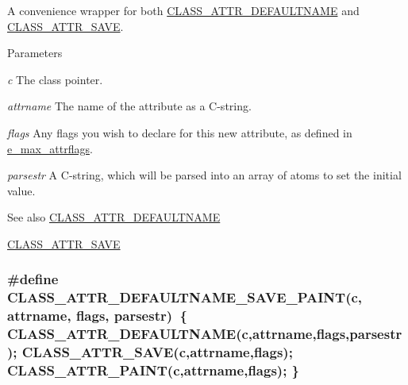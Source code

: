A convenience wrapper for both \hyperlink{group__attr_gaf6ee00a905a84d18172a212667cfa4cb}{CLASS\_\-ATTR\_\-DEFAULTNAME} and \hyperlink{group__attr_gaf56dc31d0defad3cdc1ee60b611acc79}{CLASS\_\-ATTR\_\-SAVE}. 
\begin{DoxyParams}{Parameters}
\item[{\em c}]The class pointer. \item[{\em attrname}]The name of the attribute as a C-\/string. \item[{\em flags}]Any flags you wish to declare for this new attribute, as defined in \hyperlink{group__attr_gaf296cfc6741bb19207f6ed8062809115}{e\_\-max\_\-attrflags}. \item[{\em parsestr}]A C-\/string, which will be parsed into an array of atoms to set the initial value. \end{DoxyParams}
\begin{DoxySeeAlso}{See also}
\hyperlink{group__attr_gaf6ee00a905a84d18172a212667cfa4cb}{CLASS\_\-ATTR\_\-DEFAULTNAME} 

\hyperlink{group__attr_gaf56dc31d0defad3cdc1ee60b611acc79}{CLASS\_\-ATTR\_\-SAVE} 
\end{DoxySeeAlso}
\hypertarget{group__attr_gaa341fe624851ca5eda03361822bb5e33}{
\subsubsection[{CLASS\_\-ATTR\_\-DEFAULTNAME\_\-SAVE\_\-PAINT}]{\setlength{\rightskip}{0pt plus 5cm}\#define CLASS\_\-ATTR\_\-DEFAULTNAME\_\-SAVE\_\-PAINT(c, \/  attrname, \/  flags, \/  parsestr)~\{ CLASS\_\-ATTR\_\-DEFAULTNAME(c,attrname,flags,parsestr); CLASS\_\-ATTR\_\-SAVE(c,attrname,flags); CLASS\_\-ATTR\_\-PAINT(c,attrname,flags); \}}}
\label{group__attr_gaa341fe624851ca5eda03361822bb5e33}


